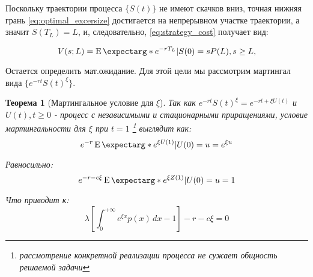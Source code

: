 \documentclass[a4paper,12pt]{article}
\newtheorem{theorem}{Теорема}
\theoremstyle{definition}
\newcommand{\expect}{\operatorname{E}\expectarg}
\begin{document}
Поскольку траектории процесса $\{S(t)\}$ не имеют скачков вниз, точная нижняя грань \eqref{eq:optimal_excersize} достигается на непрерывном участке траектории, а значит $S(T_L) = L$, и, следовательно, \eqref{eq:strategy_cost} получает вид:

\begin{equation}\label{eq:strategy_c1}
V(s; L) = \expect*{e^{-rT_L} | S(0) = s} P(L), s \ge L,
\end{equation}

Остается определить мат.ожидание. Для этой цели мы рассмотрим мартингал вида $\{e^{-rt}S(t)^{\xi}\}$. 
\begin{theorem}[Мартингальное условие для $\xi$]\label{thm:martingale_cond_for_xi}
Так как $e^{-rt}S(t)^{\xi} = e^{-rt + \xi U(t)}$ и ${U(t), t \ge 0}$ - процесс с независимыми и стационарными приращениями, условие мартингальности для $\xi$ при $t = 1$ \footnote{рассмотрение конкретной реализации процесса не сужает общность решаемой задачи} выглядит как:
\begin{equation}\label{eq:martingale_cond_for_xi}
e^{-r} \expect*{e^{\xi U(1)}|U(0) = u} = e ^ {\xi u}
\end{equation}

Равносильно:
\begin{equation}\label{eq:martingale_cond_for_xi_alt}
e^{-r - c\xi} \expect*{e^{\xi Z(1)}|U(0) = u} = 1
\end{equation}

Что приводит к:
\begin{equation}\label{eq:martingale_cond_for_xi_log}
\lambda \left[ \int_{0}^{+\infty} e^{\xi x} p(x) \,dx - 1  \right] - r - c \xi
 = 0
\end{equation}

\end{theorem}
\end{document}
